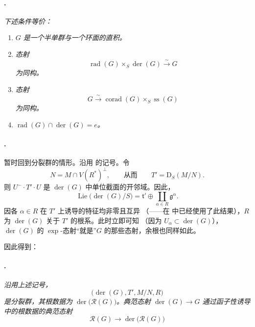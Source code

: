\paragraph{.}
\textit{下述条件等价：}
\begin{enumerate}
\item[\textup{(i)}]
\textit{\(G\) 是一个半单群与一个环面的直积。}

\item[\textup{(ii)}]
\textit{态射}
\[
  \operatorname{rad}(G)\times_S\operatorname{der}(G)
  \xrightarrow{\ \sim\ }G
\]
\textit{为同构。}

\item[\textup{(iii)}]
\textit{态射}
\[
  G\xrightarrow{\ \sim\ }
  \operatorname{corad}(G)\times_S\operatorname{ss}(G)
\]
\textit{为同构。}

\item[\textup{(iv)}]
\textit{\(\operatorname{rad}(G)\cap\operatorname{der}(G)=e\)。}
\end{enumerate}

\paragraph{.}
暂时回到分裂群的情形。沿用  的记号。令
\[
  N=M\cap V(R^*)^\perp,
  \qquad\text{从而}\qquad
  T'=\mathrm D_S(M/N).
\]
则 \(U^-\cdot T'\cdot U\) 是 \(\operatorname{der}(G)\) 中单位截面的开邻域。因此，
\[
  \operatorname{Lie}\bigl(\operatorname{der}(G)/S\bigr)
  =
  \mathfrak t'\oplus
  \coprod_{\alpha\in R}\mathfrak g^\alpha.
\]
因各 \(\alpha\in R\) 在 \(T'\) 上诱导的特征均非零且互异 \textup{（——在  中已经使用了此结果）}，\(R\) 为 \(\operatorname{der}(G)\) 关于 \(T'\) 的根系。此时立即可知 \textup{（因为 \(U_\alpha\subset\operatorname{der}(G)\)）}，\(\operatorname{der}(G)\) 的 \(\exp\)-态射“就是”\(G\) 的那些态射，余根也同样如此。

因此得到：

\paragraph{.}
\textit{沿用上述记号，}
\[
  \bigl(\operatorname{der}(G),T',M/N,R\bigr)
\]
\textit{是分裂群，其根数据为 \(\operatorname{der}\bigl(\mathcal R(G)\bigr)\)。典范态射 \(\operatorname{der}(G)\to G\) 通过函子性诱导  中的根数据的典范态射}
\[
  \mathcal R(G)\longrightarrow
  \operatorname{der}\bigl(\mathcal R(G)\bigr)
\]

